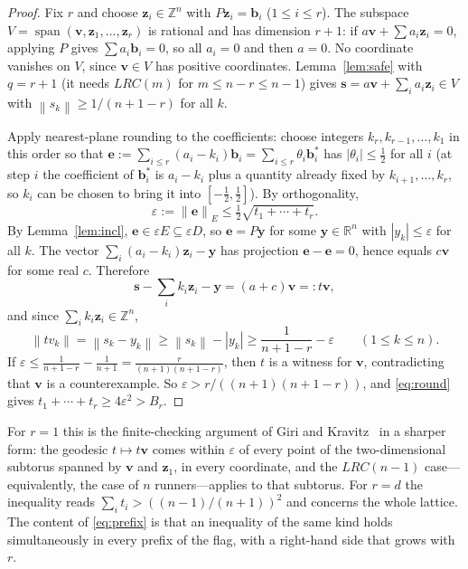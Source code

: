 \documentclass[11pt]{article}
\theoremstyle{definition}
\theoremstyle{remark}
\newcommand{\Z}{\mathbb{Z}}
\newcommand{\R}{\mathbb{R}}
\newcommand{\vct}[1]{\mathbf{#1}}
\newcommand{\nearest}[1]{\left\lVert #1\right\rVert}
\newcommand{\Enorm}[1]{\left\lVert #1\right\rVert_{E}}
\DeclareMathOperator{\spn}{span}
\begin{document}
\begin{proof}
Fix $r$ and choose $\vct{z}_i\in\Z^n$ with $P\vct{z}_i=\vct{b}_i$
($1\leq i\leq r$).  The subspace $V=\spn(\vct{v},\vct{z}_1,\ldots,\vct{z}_r)$
is rational and has dimension $r+1$: if
$a\vct{v}+\sum a_i\vct{z}_i=0$, applying $P$ gives $\sum a_i\vct{b}_i=0$,
so all $a_i=0$ and then $a=0$.  No coordinate vanishes on $V$, since
$\vct{v}\in V$ has positive coordinates.  Lemma~\ref{lem:safe} with
$q=r+1$ (it needs $LRC(m)$ for $m\leq n-r\leq n-1$) gives
$\vct{s}=a\vct{v}+\sum_ia_i\vct{z}_i\in V$ with
$\nearest{s_k}\geq1/(n+1-r)$ for all $k$.

Apply nearest-plane rounding to the coefficients: choose integers
$k_r,k_{r-1},\ldots,k_1$ in this order so that
$\vct{e}:=\sum_{i\leq r}(a_i-k_i)\vct{b}_i=\sum_{i\leq r}\theta_i\vct{b}_i^{*}$
has $|\theta_i|\leq\frac12$ for all $i$ (at step $i$ the coefficient of
$\vct{b}_i^{*}$ is $a_i-k_i$ plus a quantity already fixed by
$k_{i+1},\ldots,k_r$, so $k_i$ can be chosen to bring it into
$[-\frac12,\frac12]$).  By orthogonality,
\begin{equation}\label{eq:round}
  \varepsilon:=\Enorm{\vct{e}}\leq\tfrac12\sqrt{t_1+\cdots+t_r}.
\end{equation}
By Lemma~\ref{lem:incl}, $\vct{e}\in\varepsilon E\subseteq\varepsilon D$,
so $\vct{e}=P\vct{y}$ for some $\vct{y}\in\R^n$ with $|y_k|\leq\varepsilon$
for all $k$.  The vector $\sum_i(a_i-k_i)\vct{z}_i-\vct{y}$ has projection
$\vct{e}-\vct{e}=0$, hence equals $c\vct{v}$ for some real $c$.  Therefore
\[
  \vct{s}-\sum_ik_i\vct{z}_i-\vct{y}=(a+c)\vct{v}=:t\vct{v},
\]
and since $\sum_ik_i\vct{z}_i\in\Z^n$,
\[
  \nearest{tv_k}=\nearest{s_k-y_k}\geq\nearest{s_k}-|y_k|
  \geq\frac{1}{n+1-r}-\varepsilon\qquad(1\leq k\leq n).
\]
If $\varepsilon\leq\frac1{n+1-r}-\frac1{n+1}=\frac{r}{(n+1)(n+1-r)}$,
then $t$ is a witness for $\vct{v}$, contradicting that $\vct{v}$ is a
counterexample.  So $\varepsilon>r/((n+1)(n+1-r))$, and
\eqref{eq:round} gives $t_1+\cdots+t_r\geq4\varepsilon^2>B_r$.
\end{proof}

For $r=1$ this is the finite-checking argument of Giri and
Kravitz~\cite[\S7]{GK26} in a sharper form: the geodesic
$t\mapsto t\vct{v}$ comes within $\varepsilon$ of every point of the
two-dimensional subtorus spanned by $\vct{v}$ and $\vct{z}_1$, in every
coordinate, and the $LRC(n-1)$ case---equivalently, the case of $n$
runners---applies to that subtorus.  For $r=d$ the inequality reads
$\sum_it_i>((n-1)/(n+1))^2$ and concerns the whole lattice.  The content
of \eqref{eq:prefix} is that an inequality of the same kind holds
simultaneously in every prefix of the flag, with a right-hand side that
grows with $r$.
\end{document}

